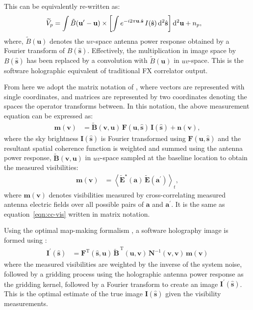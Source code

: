 \documentclass[a4paper,fleqn,usenatbib]{../mnras}
\newcommand{\dif}{\mathrm{d}}
\begin{document}
This can
be equivalently re-written as:
\begin{align}\label{eqn:software-holography}
  \widetilde{V}_p &= \int \tilde{B}(\mathbf{u}^\prime-\mathbf{u}) \times \left[\int e^{-i2\pi\mathbf{u}.\hat{\mathbf{s}}}\,I(\hat{\mathbf{s}})\,\dif^2\hat{\mathbf{s}}\right]\dif^2\mathbf{u}\vphantom{\int} + n_p,
\end{align}
where, $\tilde{B}(\mathbf{u})$ denotes the $uv$-space antenna power response
obtained by a Fourier transform of $B(\hat{\mathbf{s}})$. Effectively, the
multiplication in image space by $B(\hat{\mathbf{s}})$ has been replaced by a
convolution with $\tilde{B}(\mathbf{u})$ in $uv$-space. This is the software
holographic equivalent of traditional FX correlator output. 

From here we adopt the matrix notation of \citet{mor11}, where vectors are 
represented with single coordinates, and matrices are represented by two 
coordinates denoting the spaces the operator transforms between. 
In this notation, the above measurement equation can be expressed as:
\begin{align}
  \mathbf{m}(\mathbf{v}) &= \widetilde{\mathbf{B}}(\mathbf{v},\mathbf{u})\,\mathbf{F}(\mathbf{u},\hat{\mathbf{s}})\,\mathbf{I}(\hat{\mathbf{s}}) + \mathbf{n}(\mathbf{v}),
\end{align}
where the sky brightness $\mathbf{I}(\hat{\mathbf{s}})$ is Fourier transformed using
$\mathbf{F}(\mathbf{u},\hat{\mathbf{s}})$ and the resultant spatial coherence
function is weighted and summed using the antenna power response,
$\widetilde{\mathbf{B}}(\mathbf{v},\mathbf{u})$ in $uv$-space sampled at the baseline
location to obtain the measured visibilities:
\begin{align}
  \mathbf{m}(\mathbf{v}) &= \left\langle \widetilde{\mathbf{E}}^\star(\mathbf{a})\,\widetilde{\mathbf{E}}(\mathbf{a}^\prime)\right\rangle_t, \label{eqn:matrix-cc-vis}
\end{align}
where $\mathbf{m}(\mathbf{v})$ denotes visibilities measured by cross-correlating
measured antenna electric fields over all possible pairs of $\mathbf{a}$ and
$\mathbf{a}^\prime$. It is the same as equation~\ref{eqn:cc-vis} written in
matrix notation.

Using the optimal map-making formalism \citep{teg97a,teg97b}, a software
holography image is formed using \citep{mor09}:
\begin{align}
  \mathbf{I}^\prime(\hat{\mathbf{s}}) &= \mathbf{F}^\textrm{T}(\hat{\mathbf{s}},\mathbf{u})\,\widetilde{\mathbf{B}}^{\,\textrm{T}}(\mathbf{u},\mathbf{v})\,\mathbf{N}^{-1}(\mathbf{v},\mathbf{v})\,\mathbf{m}(\mathbf{v}) \label{eqn:dirty-image-FX}
\end{align}
where the measured visibilities are weighted by the inverse of the system noise,
followed by a gridding process using the holographic antenna power response as 
the gridding kernel, followed by a Fourier transform to create an image
$\mathbf{I}^\prime(\hat{\mathbf{s}})$. This is the optimal estimate of the true image 
$\mathbf{I}(\hat{\mathbf{s}})$ given the visibility measurements.
\end{document}
